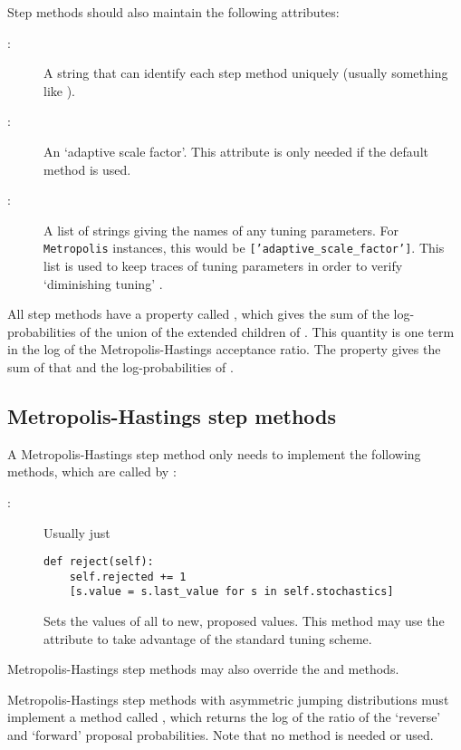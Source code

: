 Step methods should also maintain the following attributes:
\begin{description}
   \item[:] A string that can identify each step method uniquely (usually something like ).
   \item[:] An `adaptive scale factor'. This attribute is only needed if the default  method is used.
   \item[:] A list of strings giving the names of any tuning parameters. For \texttt{Metropolis} instances, this would be \texttt{['adaptive_scale_factor']}. This list is used to keep traces of tuning parameters in order to verify `diminishing tuning' \citep{tuning}.
\end{description}

All step methods have a property called , which gives the sum of the log-probabilities of the union of the extended children of . This quantity is one term in the log of the Metropolis-Hastings acceptance ratio. The  property gives the sum of that and the log-probabilities of .  



\subsection{Metropolis-Hastings step methods} \label{user-metro}

A Metropolis-Hastings step method only needs to implement the following methods, which are called by :
\begin{description}
   \item[:] Usually just
   \begin{verbatim}
def reject(self):
    self.rejected += 1
    [s.value = s.last_value for s in self.stochastics]
   \end{verbatim}
   \item[] Sets the values of all  to new, proposed values. This method may use the  attribute to take advantage of the standard tuning scheme.
\end{description}
Metropolis-Hastings step methods may also override the  and  methods.

Metropolis-Hastings step methods with asymmetric jumping distributions must implement a method called , which returns the log of the ratio of the `reverse' and `forward' proposal probabilities. Note that no  method is needed or used.

